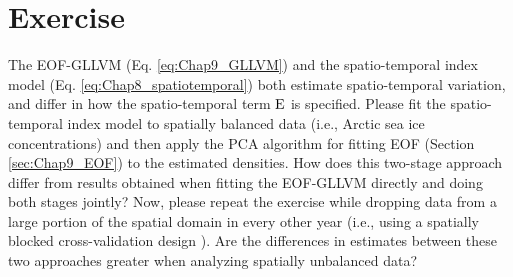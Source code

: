 \section{Exercise}

The EOF-GLLVM (Eq. \ref{eq:Chap9_GLLVM}) and the spatio-temporal index model (Eq. \ref{eq:Chap8_spatiotemporal}) both estimate spatio-temporal variation, and differ in how the spatio-temporal term \(\mathbf{\operatorname{E}}\) is specified.  Please fit the spatio-temporal index model to spatially balanced data (i.e., Arctic sea ice concentrations) and then apply the PCA algorithm for fitting EOF (Section \ref{sec:Chap9_EOF}) to the estimated densities.  How does this two-stage approach differ from results obtained when fitting the EOF-GLLVM directly and doing both stages jointly?  Now, please repeat the exercise while dropping data from a large portion of the spatial domain in every other year (i.e., using a spatially blocked cross-validation design \cite{roberts_cross-validation_2017}).  Are the differences in estimates between these two approaches greater when analyzing spatially unbalanced data?    

